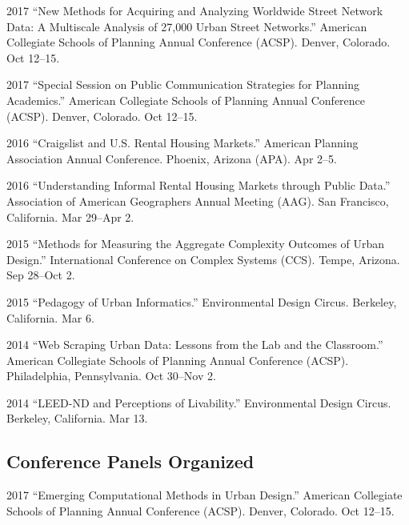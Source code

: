 \documentclass{academiccv}
\begin{document}
\begin{tablist}

\item[2017] \tab \enquote{New Methods for Acquiring and Analyzing Worldwide Street Network Data: A Multiscale Analysis of 27,000 Urban Street Networks.} American Collegiate Schools of Planning Annual Conference (ACSP). Denver, Colorado. Oct 12--15.

\item[2017] \tab \enquote{Special Session on Public Communication Strategies for Planning Academics.} American Collegiate Schools of Planning Annual Conference (ACSP). Denver, Colorado. Oct 12--15.

\item[2016] \tab \enquote{Craigslist and U.S. Rental Housing Markets.} American Planning Association Annual Conference. Phoenix, Arizona (APA). Apr 2--5.

\item[2016] \tab \enquote{Understanding Informal Rental Housing Markets through Public Data.} Association of American Geographers Annual Meeting (AAG). San Francisco, California. Mar 29--Apr 2.

\item[2015] \tab \enquote{Methods for Measuring the Aggregate Complexity Outcomes of Urban Design.} International Conference on Complex Systems (CCS). Tempe, Arizona. Sep 28--Oct 2.

\item[2015] \tab \enquote{Pedagogy of Urban Informatics.} Environmental Design Circus. Berkeley, California. Mar 6.

\item[2014] \tab \enquote{Web Scraping Urban Data: Lessons from the Lab and the Classroom.} American Collegiate Schools of Planning Annual Conference (ACSP). Philadelphia, Pennsylvania. Oct 30--Nov 2.

\item[2014] \tab \enquote{LEED-ND and Perceptions of Livability.} Environmental Design Circus. Berkeley, California. Mar 13.

\end{tablist}



\subsection*{Conference Panels Organized}

\begin{tablist}

\item[2017] \tab \enquote{Emerging Computational Methods in Urban Design.} American Collegiate Schools of Planning Annual Conference (ACSP). Denver, Colorado. Oct 12--15.

\end{tablist}
\end{document}
